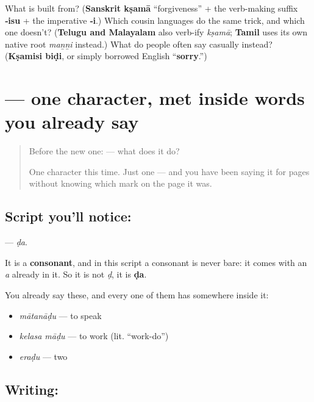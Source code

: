 \begin{tcolorbox}[breakable,colback=teal!4,colframe=teal!35!black,title={Before you move on}]
What is \textbf{} built from? (\textbf{Sanskrit kṣamā} \textquotedblleft{}forgiveness\textquotedblright{} + the verb-making suffix \textbf{‑isu} + the imperative \textbf{‑i}.) Which cousin languages do the same trick, and which one doesn't? (\textbf{Telugu and Malayalam} also verb-ify \emph{kṣamā}; \textbf{Tamil} uses its own native root \emph{maṉṉi} instead.) What do people often say casually instead? (\textbf{Kṣamisi biḍi}, or simply borrowed English \textquotedblleft{}\textbf{sorry}.\textquotedblright{})
\end{tcolorbox}
\section[\texorpdfstring{\kn{ಡ} (ḍa)}{ಡ (ḍa)}]{ — one character, met inside words you already say}

\label{lesson:KA-S118-letter-dda}



\begin{quote}
Before the new one:  — what does it do?

One character this time. Just one — and you have been saying it for pages without knowing which mark on the page it was.
\end{quote}

\subsection*{Script you'll notice: }
\textbf{} — \emph{ḍa}.

It is a \textbf{consonant}, and in this script a consonant is never bare: it comes with an \emph{a} already in it. So it is not \emph{ḍ}, it is \textbf{ḍa}.

You already say these, and every one of them has  somewhere inside it:

\begin{itemize}
\raggedright
  \item \textbf{} \emph{mātanāḍu} — to speak
  \item \textbf{ } \emph{kelasa māḍu} — to work (lit. \textquotedblleft{}work-do\textquotedblright{})
  \item \textbf{} \emph{eraḍu} — two
\end{itemize}

\subsection*{Writing: }

